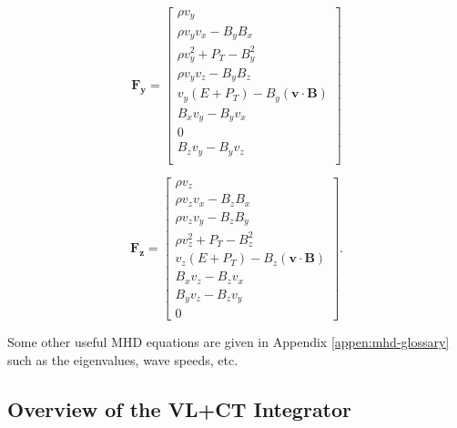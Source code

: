 \begin{equation}
    \boldsymbol{F_y} = \begin{bmatrix}
            \rho v_{y} \\
            \rho v_{y} v_{x} - B_{y} B_{x} \\
            \rho v_{y}^2 + P_{T} - B_{y}^2 \\
            \rho v_{y} v_{z} - B_{y} B_{z} \\
            v_{y} \left( E + P_{T} \right) - B_{y} \left( \boldsymbol{v} \cdot \boldsymbol{B} \right) \\
            B_{x} v_{y} - B_{y} v_{x} \\
            0 \\
            B_{z} v_{y} - B_{y} v_{z} \\
         \end{bmatrix}
\end{equation}

\begin{equation}
    \boldsymbol{F_z} = \begin{bmatrix}
            \rho v_{z} \\
            \rho v_{z} v_{x} - B_{z} B_{x} \\
            \rho v_{z} v_{y} - B_{z} B_{y} \\
            \rho v_{z}^2 + P_{T} - B_{z}^2 \\
            v_{z} \left( E + P_{T} \right) - B_{z} \left( \boldsymbol{v} \cdot \boldsymbol{B} \right) \\
            B_{x} v_{z} - B_{z} v_{x} \\
            B_{y} v_{z} - B_{z} v_{y} \\
            0
         \end{bmatrix}.
\end{equation}

Some other useful MHD equations are given in Appendix \ref{appen:mhd-glossary} such as the eigenvalues, wave speeds, etc.



\subsection{Overview of the VL+CT Integrator}
\label{sec:vlct-summary}

